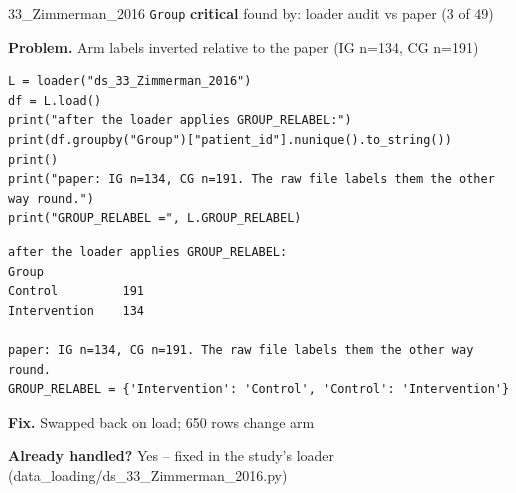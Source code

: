 \documentclass[9pt, t, handout]{beamer}
\newcommand{\ans}[1]{\textcolor{structure.fg}{#1}}
\begin{document}
\begin{frame}[fragile]{33\_Zimmerman\_2016 \quad \texttt{Group}}
  {\scriptsize\textcolor{red!70!black}{\textbf{critical}} \quad
   found by: loader audit vs paper \quad (3 of 49)}
  \vspace{3pt}

  {\footnotesize \textbf{Problem.} Arm labels inverted relative to the paper (IG n=134, CG n=191)}
  \vspace{4pt}

  \begin{Verbatim}[fontsize=\tiny, frame=single, framesep=2pt, label=\tiny reproduce]
L = loader("ds_33_Zimmerman_2016")
df = L.load()
print("after the loader applies GROUP_RELABEL:")
print(df.groupby("Group")["patient_id"].nunique().to_string())
print()
print("paper: IG n=134, CG n=191. The raw file labels them the other way round.")
print("GROUP_RELABEL =", L.GROUP_RELABEL)
  \end{Verbatim}
  \begin{Verbatim}[fontsize=\tiny, frame=single, framesep=2pt, label=\tiny output]
after the loader applies GROUP_RELABEL:
Group
Control         191
Intervention    134

paper: IG n=134, CG n=191. The raw file labels them the other way round.
GROUP_RELABEL = {'Intervention': 'Control', 'Control': 'Intervention'}
  \end{Verbatim}
  \vspace{2pt}

  {\footnotesize \textbf{Fix.} Swapped back on load; 650 rows change arm}
  \vspace{2pt}

  {\footnotesize \textbf{Already handled?} \ans{Yes} -- fixed in the study's loader
   (data\_loading/ds\_33\_Zimmerman\_2016.py)}
\end{frame}
\end{document}
